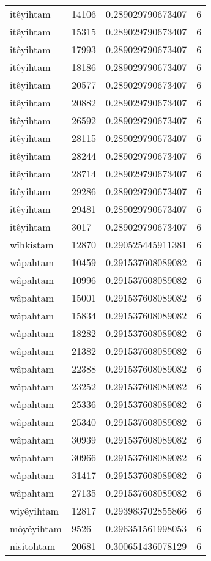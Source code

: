 \begin{longtable}{llll}
itêyihtam & 14106 & 0.289029790673407 & 6 \\
itêyihtam & 15315 & 0.289029790673407 & 6 \\
itêyihtam & 17993 & 0.289029790673407 & 6 \\
itêyihtam & 18186 & 0.289029790673407 & 6 \\
itêyihtam & 20577 & 0.289029790673407 & 6 \\
itêyihtam & 20882 & 0.289029790673407 & 6 \\
itêyihtam & 26592 & 0.289029790673407 & 6 \\
itêyihtam & 28115 & 0.289029790673407 & 6 \\
itêyihtam & 28244 & 0.289029790673407 & 6 \\
itêyihtam & 28714 & 0.289029790673407 & 6 \\
itêyihtam & 29286 & 0.289029790673407 & 6 \\
itêyihtam & 29481 & 0.289029790673407 & 6 \\
itêyihtam & 3017 & 0.289029790673407 & 6 \\
wîhkistam & 12870 & 0.290525445911381 & 6 \\
wâpahtam & 10459 & 0.291537608089082 & 6 \\
wâpahtam & 10996 & 0.291537608089082 & 6 \\
wâpahtam & 15001 & 0.291537608089082 & 6 \\
wâpahtam & 15834 & 0.291537608089082 & 6 \\
wâpahtam & 18282 & 0.291537608089082 & 6 \\
wâpahtam & 21382 & 0.291537608089082 & 6 \\
wâpahtam & 22388 & 0.291537608089082 & 6 \\
wâpahtam & 23252 & 0.291537608089082 & 6 \\
wâpahtam & 25336 & 0.291537608089082 & 6 \\
wâpahtam & 25340 & 0.291537608089082 & 6 \\
wâpahtam & 30939 & 0.291537608089082 & 6 \\
wâpahtam & 30966 & 0.291537608089082 & 6 \\
wâpahtam & 31417 & 0.291537608089082 & 6 \\
wâpahtam & 27135 & 0.291537608089082 & 6 \\
wiyêyihtam & 12817 & 0.293983702855866 & 6 \\
môyêyihtam & 9526 & 0.296351561998053 & 6 \\
nisitohtam & 20681 & 0.300651436078129 & 6 \\

\end{longtable}
